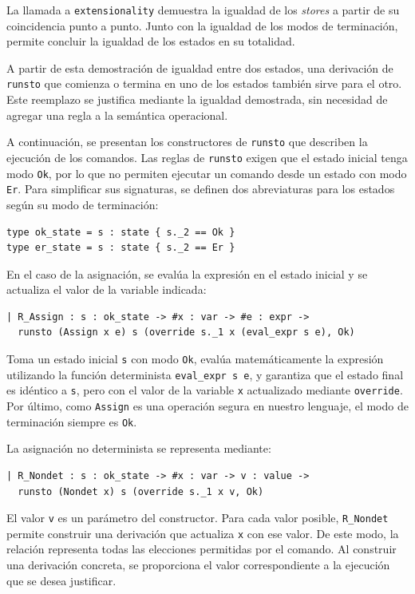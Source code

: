 \documentclass[a4paper,	11pt]{report}
\newif\ifdraft\drafttrue
\newcommand{\comm}[3]{\ifdraft{{\color{#1}[#2: #3]}}\fi}
\newcommand{\guido}[1]{\comm{blue}{Guido}{#1}}
\begin{document}
La llamada a \lstinline|extensionality| demuestra la igualdad de los \emph{stores} a partir de su coincidencia punto a punto.
Junto con la igualdad de los modos de terminación,
permite concluir la igualdad de los estados en su totalidad.

A partir de esta demostración de igualdad entre dos estados,
una derivación de \lstinline|runsto| que comienza o termina en uno de los estados también sirve para el otro.
Este reemplazo se justifica mediante la igualdad demostrada,
sin necesidad de agregar una regla a la semántica operacional.

A continuación,
se presentan los constructores de \lstinline|runsto| que describen la ejecución de los comandos.
Las reglas de \lstinline|runsto| exigen que el estado inicial tenga modo \lstinline|Ok|,
por lo que no permiten ejecutar un comando desde un estado con modo \lstinline|Er|.
Para simplificar sus signaturas,
se definen dos abreviaturas para los estados según su modo de terminación:

\begin{lstlisting}
type ok_state = s : state { s._2 == Ok }
type er_state = s : state { s._2 == Er }  
\end{lstlisting}

En el caso de la asignación,
se evalúa la expresión en el estado inicial y se actualiza el valor de la variable indicada:

\begin{lstlisting}
| R_Assign : s : ok_state -> #x : var -> #e : expr ->
  runsto (Assign x e) s (override s._1 x (eval_expr s e), Ok)
\end{lstlisting}
Toma un estado inicial \lstinline|s| con modo \lstinline|Ok|,
evalúa matemáticamente la expresión utilizando la función determinista \lstinline|eval_expr s e|,
y garantiza que el estado final es idéntico a \lstinline|s|,
pero con el valor de la variable \lstinline|x| actualizado mediante \lstinline|override|.
Por último, como \lstinline|Assign| es una operación segura en nuestro lenguaje,
el modo de terminación siempre es \lstinline|Ok|.

La asignación no determinista se representa mediante:

\begin{lstlisting}
| R_Nondet : s : ok_state -> #x : var -> v : value ->
  runsto (Nondet x) s (override s._1 x v, Ok)
\end{lstlisting}
El valor \lstinline|v| es un parámetro del constructor.
Para cada valor posible,
\lstinline|R_Nondet| permite construir una derivación que actualiza \lstinline|x| con ese valor.
De este modo,
la relación representa todas las elecciones permitidas por el comando.
Al construir una derivación concreta,
se proporciona el valor correspondiente a la ejecución que se desea justificar.
\end{document}
